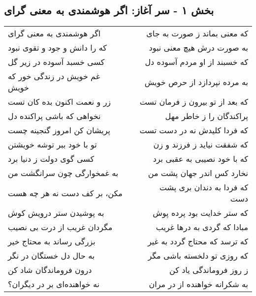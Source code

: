 \begin{center}
\section*{بخش ۱ - سر آغاز: اگر هوشمندی به معنی گرای}
\label{sec:001}
\begin{longtable}{l p{0.5cm} r}
اگر هوشمندی به معنی گرای
&&
که معنی بماند ز صورت به جای
\\
که را دانش و جود و تقوی نبود
&&
به صورت درش هیچ معنی نبود
\\
کسی خسبد آسوده در زیر گل
&&
که خسبند از او مردم آسوده دل
\\
غم خویش در زندگی خور که خویش
&&
به مرده نپردازد از حرص خویش
\\
زر و نعمت اکنون بده کان تست
&&
که بعد از تو بیرون ز فرمان تست
\\
نخواهی که باشی پراکنده دل
&&
پراکندگان را ز خاطر مهل
\\
پریشان کن امروز گنجینه چست
&&
که فردا کلیدش نه در دست تست
\\
تو با خود ببر توشه خویشتن
&&
که شفقت نیاید ز فرزند و زن
\\
کسی گوی دولت ز دنیا برد
&&
که با خود نصیبی به عقبی برد
\\
به غمخوارگی چون سرانگشت من
&&
نخارد کس اندر جهان پشت من
\\
مکن، بر کف دست نه هر چه هست
&&
که فردا به دندان بری پشت دست
\\
به پوشیدن ستر درویش کوش
&&
که ستر خدایت بود پرده پوش
\\
مگردان غریب از درت بی نصیب
&&
مبادا که گردی به درها غریب
\\
بزرگی رساند به محتاج خیر
&&
که ترسد که محتاج گردد به غیر
\\
به حال دل خستگان در نگر
&&
که روزی تو دلخسته باشی مگر
\\
درون فروماندگان شاد کن
&&
ز روز فروماندگی یاد کن
\\
نه خواهنده‌ای بر در دیگران؟
&&
به شکرانه خواهنده از در مران
\\
\end{longtable}
\end{center}
